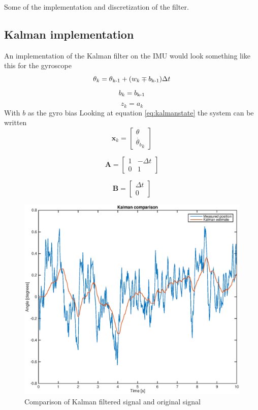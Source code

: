 \documentclass[a4paper,11pt]{kth-mag}
\begin{document}
Some of the implementation and discretization of the filter.
\subsection{Kalman implementation}
An implementation of the Kalman filter on the IMU would look something like this for the gyroscope
\begin{equation}
\theta_k = \theta \textsubscript{k-1} + (w_k \mp b\textsubscript{k-1}) \Delta t
\end{equation}
\begin{equation}
b_k = b\textsubscript{k-1}
\end{equation}
\begin{equation}
z_k = a_k
\end{equation}
With $b$ as the gyro bias
Looking at equation \eqref{eq:kalmanstate} the system can be written
\begin{equation}
\textbf{x}_k = \begin{bmatrix}
\theta \\
\dot{\theta_b}_k
\end{bmatrix}
\end{equation}

\begin{equation}
\textbf{A} = \begin{bmatrix}
1  & -\Delta t \\
0   & 1
\end{bmatrix}
\end{equation}

\begin{equation}
\textbf{B} = \begin{bmatrix}
\Delta t \\ 0
\end{bmatrix}
\end{equation}


\begin{figure}[!htb]
\centering
\includegraphics[scale=.7]{Kalmancomparisonplot.eps}
\caption{Comparison of Kalman filtered signal and original signal}
\label{fig:Kalman comparison}
\end{figure}
\end{document}
